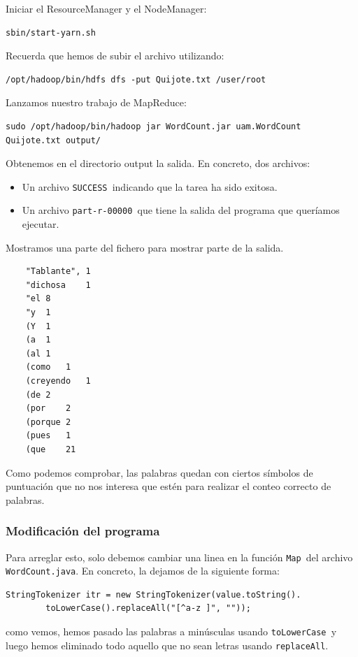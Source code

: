 \documentclass[11pt]{article}
\def\inline{\lstinline[basicstyle=\ttfamily,keywordstyle={}]}
\begin{document}
Iniciar el ResourceManager y el NodeManager:

\begin{verbatim}
sbin/start-yarn.sh
\end{verbatim}

Recuerda que hemos de subir el archivo utilizando:
\begin{verbatim}
/opt/hadoop/bin/hdfs dfs -put Quijote.txt /user/root
\end{verbatim}

Lanzamos nuestro trabajo de MapReduce:

\begin{verbatim}
sudo /opt/hadoop/bin/hadoop jar WordCount.jar uam.WordCount Quijote.txt output/
\end{verbatim}

Obtenemos en el directorio output la salida. En concreto, dos archivos:
\begin{itemize}
\item Un archivo  \inline{SUCCESS }indicando que la tarea ha sido exitosa.
\item Un archivo  \inline{part-r-00000 }que tiene la salida del programa que queríamos ejecutar.
\end{itemize}

Mostramos una parte del fichero para mostrar parte de la salida.

\begin{verbatim}
    "Tablante",	1
    "dichosa	1
    "el	8
    "y	1
    (Y	1
    (a	1
    (al	1
    (como	1
    (creyendo	1
    (de	2
    (por	2
    (porque	2
    (pues	1
    (que	21
\end{verbatim}

Como podemos comprobar, las palabras quedan con ciertos símbolos de puntuación que no nos interesa que estén para realizar el conteo correcto de palabras. 

\subsubsection*{ Modificación del programa }

Para arreglar esto, solo debemos cambiar una linea en la función \inline{Map }del archivo  \inline{WordCount.java}. En concreto, la dejamos de la siguiente forma:

\begin{verbatim}
StringTokenizer itr = new StringTokenizer(value.toString().
        toLowerCase().replaceAll("[^a-z ]", ""));
\end{verbatim}
como vemos, hemos pasado las palabras a minúsculas usando \inline{toLowerCase }y luego hemos eliminado todo aquello que no sean letras usando  \inline{replaceAll}.
\end{document}
